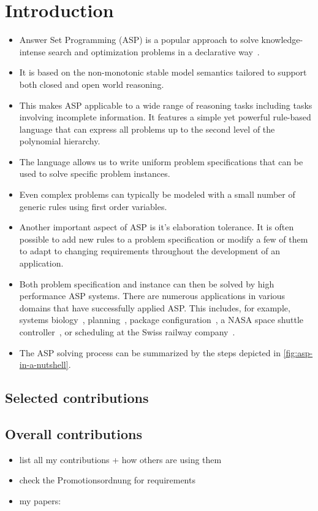 \chapter{Introduction}\label{sec:introduction}

\begin{itemize}
  \item 
  Answer Set Programming (ASP) is a popular approach
  to solve knowledge-intense search and optimization problems in a declarative way~\cites{baral02a,gekakasc12a}.
  \item
  It is based on the non-monotonic stable model semantics
  tailored to support both closed and open world reasoning.
  \item 
  This makes ASP applicable to a wide range of reasoning tasks including tasks involving incomplete information.
  It features a simple yet powerful rule-based language
  that can express all problems up to the second level of the polynomial hierarchy.
  \item
  The language allows us to write uniform problem specifications that can be used to solve specific problem instances.
  \item
  Even complex problems can typically be modeled with a small number of generic rules using first order variables.
  \item
  Another important aspect of ASP is it's elaboration tolerance.
  It is often possible to add new rules to a problem specification or modify a few of them
  to adapt to changing requirements throughout the development of an application.
  \item 
  Both problem specification and instance can then be solved by high performance ASP systems.
  There are numerous applications in various domains that have successfully applied {ASP}.
  This includes, for example,  systems biology~\cite{kascsivi13a},
  planning~\cite{gekaknsc11a},
  package configuration~\cite{gekasc11c},
  a NASA space shuttle controller~\cite{nobagewaba01a}, or
  scheduling at the Swiss railway company~\cite{abjoossctowa21a}.
  \item
  
  The ASP solving process can be summarized by the steps depicted in \cref{fig:asp-in-a-nutshell}.
\end{itemize}

\section{Selected contributions}

\section{Overall contributions}

\begin{itemize}
  \item list all my contributions + how others are using them
\end{itemize}

\begin{itemize}
  \item check the Promotionsordnung for requirements
  \item my papers: \cites{}
\end{itemize}
